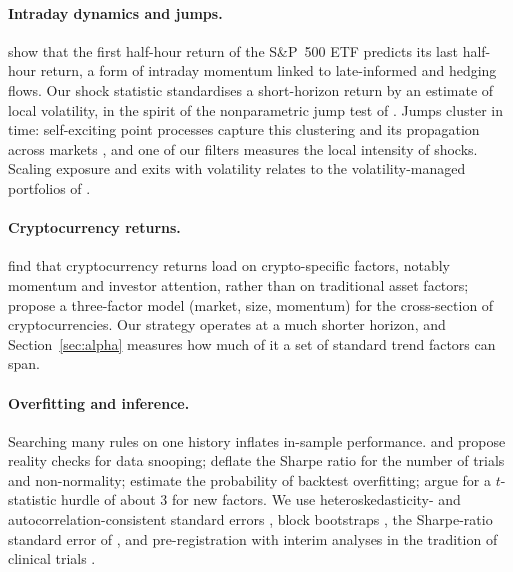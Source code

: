 \documentclass[11pt,a4paper]{article}
\newcommand{\1}{\mathbf{1}}
\begin{document}
\paragraph{Intraday dynamics and jumps.} \citet{GaoHanLiZhou2018} show that the first half-hour return of the S\&P~500 ETF predicts its last half-hour return, a form of intraday momentum linked to late-informed and hedging flows. Our shock statistic standardises a short-horizon return by an estimate of local volatility, in the spirit of the nonparametric jump test of \citet{LeeMykland2008}. Jumps cluster in time: self-exciting point processes \citep{Hawkes1971} capture this clustering and its propagation across markets \citep{AitSahaliaCachoDiazLaeven2015}, and one of our filters measures the local intensity of shocks. Scaling exposure and exits with volatility relates to the volatility-managed portfolios of \citet{MoreiraMuir2017}.

\paragraph{Cryptocurrency returns.} \citet{LiuTsyvinski2021} find that cryptocurrency returns load on crypto-specific factors, notably momentum and investor attention, rather than on traditional asset factors; \citet{LiuTsyvinskiWu2022} propose a three-factor model (market, size, momentum) for the cross-section of cryptocurrencies. Our strategy operates at a much shorter horizon, and Section~\ref{sec:alpha} measures how much of it a set of standard trend factors can span.

\paragraph{Overfitting and inference.} Searching many rules on one history inflates in-sample performance. \citet{White2000} and \citet{Hansen2005} propose reality checks for data snooping; \citet{BaileyLopezdePrado2014} deflate the Sharpe ratio for the number of trials and non-normality; \citet{BaileyEtAl2017} estimate the probability of backtest overfitting; \citet{HarveyLiuZhu2016} argue for a $t$-statistic hurdle of about 3 for new factors. We use heteroskedasticity- and autocorrelation-consistent standard errors \citep{NeweyWest1987}, block bootstraps \citep{Kunsch1989,PolitisRomano1994}, the Sharpe-ratio standard error of \citet{Lo2002}, and pre-registration with interim analyses in the tradition of clinical trials \citep{Haybittle1971,PetoEtAl1976,NosekEtAl2018}.
\end{document}

